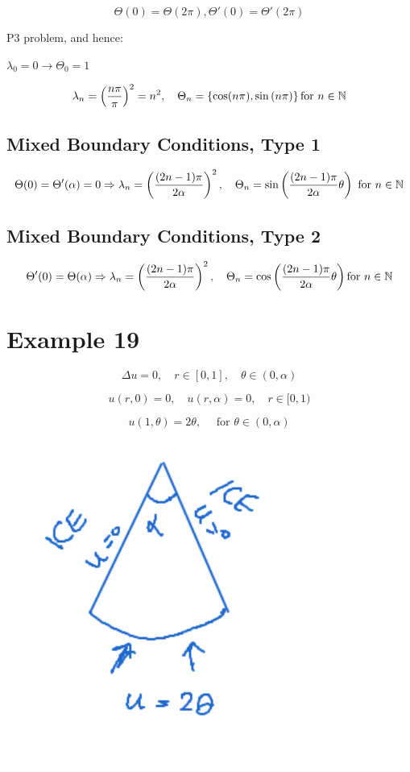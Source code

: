 \documentclass{article}
\begin{document}
$$\Theta(0) = \Theta(2 \pi), \Theta'(0) = \Theta'(2 \pi)$$

P3 problem, and hence:

$\lambda_0 = 0 \to \Theta_0 = 1$

$$\lambda_n = \left( \frac{n \pi}{\pi} \right)^2 = n^2, \quad \Theta_n = \left\{ \cos(n \pi), \sin \left( n \pi \right) \right\} \text {for } n \in \mathbb{N}$$

\subsection*{Mixed Boundary Conditions, Type 1}

$$\Theta(0) = \Theta'(\alpha) = 0 \Rightarrow \lambda_n = \left( \frac{(2n-1) \pi}{2 \alpha} \right)^2, \quad \Theta_n = \sin \left( \frac{(2n-1) \pi}{2 \alpha} \theta \right) \text { for } n \in \mathbb{N}$$

\subsection*{Mixed Boundary Conditions, Type 2}

$$\Theta'(0) = \Theta(\alpha) \Rightarrow \lambda_n = \left( \frac{(2n-1) \pi}{2 \alpha} \right)^2, \quad \Theta_n = \cos \left( \frac{(2n-1) \pi}{2 \alpha} \theta \right) \text {for } n \in \mathbb{N}$$

\section{Example 19}

$$\Delta u = 0, \quad r \in [0,1], \quad \theta \in (0, \alpha)$$

$$u(r,0) = 0, \quad u(r, \alpha) = 0, \quad r \in [0,1)$$

$$u(1, \theta) = 2 \theta, \quad \text { for } \theta \in (0, \alpha)$$

\begin{center}
    \includegraphics[width = 0.6 \textwidth]{4.png}
\end{center}
\end{document}
